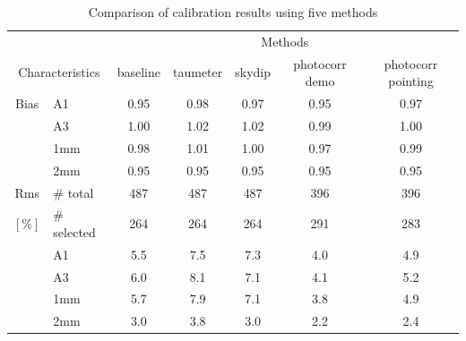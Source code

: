 \begin{table}[!thbp]
\begin{center}
\begin{tabular}{|c|l|c|c|c|c|c|}
  \hline
  \multicolumn{2}{|c|}{}  &  \multicolumn{5}{|c|}{Methods} \\\cline{3-7}
  \multicolumn{2}{|c|}{Characteristics} &  baseline  & taumeter  &  skydip  &  photocorr demo & photocorr pointing \\
  \hline\hline
  Bias &  A1            &   0.95   &  0.98    &  0.97    &   0.95    &  0.97  \\
       &  A3            &   1.00   &  1.02    &  1.02    &   0.99    &  1.00  \\
       &  1mm           &   0.98   &  1.01    &  1.00    &   0.97    &  0.99  \\
       &  2mm           &   0.95   &  0.95    &  0.95    &   0.95    &  0.95  \\
  \hline
  Rms  &  $\#$ total    &   487    &    487   &    487    &    396    &  396 \\
  $[\%]$ &  $\#$ selected &   264    &    264   &    264    &    291    &  283 \\
       &  A1            &   5.5    &    7.5   &    7.3    &    4.0    &  4.9 \\
       &  A3            &   6.0    &    8.1   &    7.1    &    4.1    &  5.2 \\
       &  1mm           &   5.7    &    7.9   &    7.1    &    3.8    &  4.9 \\
       &  2mm           &   3.0    &    3.8   &    3.0    &    2.2    &  2.4 \\
\hline\hline
\end{tabular}
\caption[Comparison of calibration results using five methods]{Comparison of calibration results using five methods}
\label{tab:Calibration_results_all}
\end{center}
\end{table}


